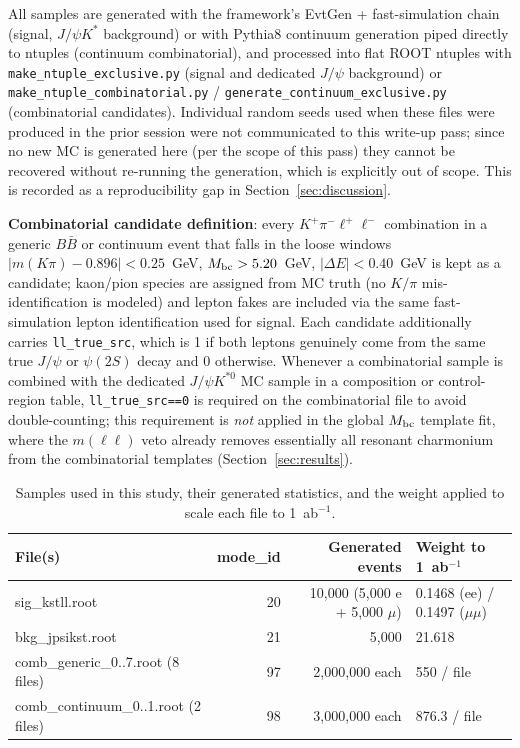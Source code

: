 \documentclass[11pt]{article}
\begin{document}
All samples are generated with the framework's EvtGen + fast-simulation
chain (signal, $J/\psi K^{*}$ background) or with Pythia8 continuum
generation piped directly to ntuples (continuum combinatorial), and
processed into flat ROOT ntuples with \texttt{make\_ntuple\_exclusive.py}
(signal and dedicated $J/\psi$ background) or
\texttt{make\_ntuple\_combinatorial.py} /
\texttt{generate\_continuum\_exclusive.py} (combinatorial candidates).
Individual random seeds used when these files were produced in the
prior session were not communicated to this write-up pass; since no new
MC is generated here (per the scope of this pass) they cannot be
recovered without re-running the generation, which is explicitly out of
scope. This is recorded as a reproducibility gap in
Section~\ref{sec:discussion}.

\textbf{Combinatorial candidate definition}: every $K^+\pi^-\ell^+\ell^-$
combination in a generic $B\bar B$ or continuum event that falls in the
loose windows $|m(K\pi)-0.896|<0.25$~GeV, $M_{\rm bc}>5.20$~GeV,
$|\Delta E|<0.40$~GeV is kept as a candidate; kaon/pion species are
assigned from MC truth (no $K/\pi$ mis-identification is modeled) and
lepton fakes are included via the same fast-simulation lepton
identification used for signal. Each candidate additionally carries
\texttt{ll\_true\_src}, which is 1 if both leptons genuinely come from
the same true $J/\psi$ or $\psi(2S)$ decay and 0 otherwise. Whenever a
combinatorial sample is combined with the dedicated $J/\psi K^{*0}$ MC
sample in a composition or control-region table,
\texttt{ll\_true\_src==0} is required on the combinatorial file to
avoid double-counting; this requirement is \emph{not} applied in the
global $M_{\rm bc}$ template fit, where the $m(\ell\ell)$ veto already
removes essentially all resonant charmonium from the combinatorial
templates (Section~\ref{sec:results}).

\begin{table}[H]
\centering
\caption{Samples used in this study, their generated statistics, and
the weight applied to scale each file to 1~ab$^{-1}$.}
\label{tab:samples}
\begin{tabular}{lrrl}
\toprule
File(s) & mode\_id & Generated events & Weight to 1~ab$^{-1}$ \\
\midrule
sig\_kstll.root & 20 & 10,000 (5,000 e + 5,000 $\mu$) & 0.1468 (ee) / 0.1497 ($\mu\mu$) \\
bkg\_jpsikst.root & 21 & 5,000 & 21.618 \\
comb\_generic\_0..7.root (8 files) & 97 & 2,000,000 each & 550 / file \\
comb\_continuum\_0..1.root (2 files) & 98 & 3,000,000 each & 876.3 / file \\
\bottomrule
\end{tabular}
\end{table}
\end{document}
